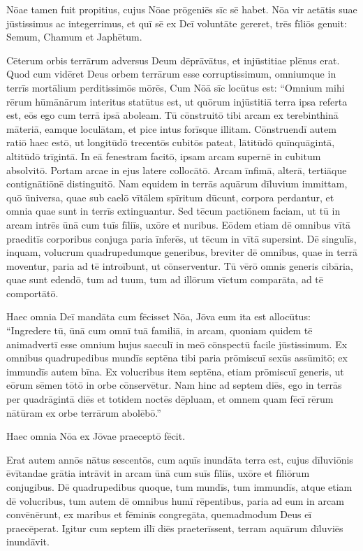 \Versus Nōae tamen fuit propitius,
\Versus cujus Nōae prōgeniēs sīc sē habet. Nōa vir aetātis suae jūstissimus ac integerrimus, et quī sē ex Deī voluntāte gereret,
\Versus trēs fīliōs genuit: Semum, Chamum et Japhētum.

\Versus Cēterum orbis terrārum adversus Deum dēprāvātus, et injūstitiae plēnus erat.
\Versus Quod cum vidēret Deus orbem terrārum esse corruptissimum, omniumque in terrīs mortālium perditissimōs mōrēs,
\Versus Cum Nōā sīc locūtus est: ``Omnium mihi rērum hūmānārum interitus statūtus est, ut quōrum injūstitiā terra ipsa referta est, eōs ego cum terrā ipsā aboleam.
\Versus Tū cōnstruitō tibi arcam ex terebinthinā māteriā, eamque loculātam, et pice intus forīsque illitam.
\Versus Cōnstruendī autem ratiō haec estō, ut longitūdō trecentōs cubitōs pateat, lātitūdō quīnquāgintā, altitūdō trīgintā.
\Versus In eā fenestram facitō, ipsam arcam supernē in cubitum absolvitō. Portam arcae in ejus latere collocātō. Arcam īnfimā, alterā, tertiāque contignātiōnē distinguitō.
\Versus Nam equidem in terrās aquārum dīluvium immittam, quō ūniversa, quae sub caelō vītālem spīritum dūcunt, corpora perdantur, et omnia quae sunt in terrīs extinguantur.
\Versus Sed tēcum pactiōnem faciam, ut tū in arcam intrēs ūnā cum tuīs fīliīs, uxōre et nuribus.
\Versus Eōdem etiam dē omnibus vītā praeditīs corporibus conjuga paria īnferēs, ut tēcum in vītā supersint.
\Versus Dē singulīs, inquam, volucrum quadrupedumque generibus, breviter dē omnibus, quae in terrā moventur, paria ad tē introībunt, ut cōnserventur.
\Versus Tū vērō omnis generis cibāria, quae sunt edendō, tum ad tuum, tum ad illōrum vīctum comparāta, ad tē comportātō.



\Caput
\Versus Haec omnia Deī mandāta cum fēcisset Nōa, Jōva eum ita est allocūtus: ``Ingredere tū, ūnā cum omnī tuā familiā, in arcam, quoniam quidem tē animadvertī esse omnium hujus saeculī in meō cōnspectū facile jūstissimum.
\Versus Ex omnibus quadrupedibus mundīs septēna tibi paria prōmiscuī sexūs assūmitō; ex immundīs autem bīna.
\Versus Ex volucribus item septēna, etiam prōmiscuī generis, ut eōrum sēmen tōtō in orbe cōnservētur.
\Versus Nam hinc ad septem diēs, ego in terrās per quadrāgintā diēs et totidem noctēs dēpluam, et omnem quam fēcī rērum nātūram ex orbe terrārum abolēbō.''

\Versus Haec omnia Nōa ex Jōvae praeceptō fēcit.

\Versus Erat autem annōs nātus sescentōs, cum aquīs inundāta terra est,
\Versus cujus dīluviōnis ēvītandae grātia intrāvit in arcam ūnā cum suīs fīliīs, uxōre et fīliōrum conjugibus.
\Versus Dē quadrupedibus quoque, tum mundīs, tum immundīs, atque etiam dē volucribus, tum autem dē omnibus humī rēpentibus,
\Versus paria ad eum in arcam convēnērunt, ex maribus et fēminīs congregāta, quemadmodum Deus eī praecēperat.
\Versus Igitur cum septem illī diēs praeterīssent, terram aquārum dīluviēs inundāvit.

